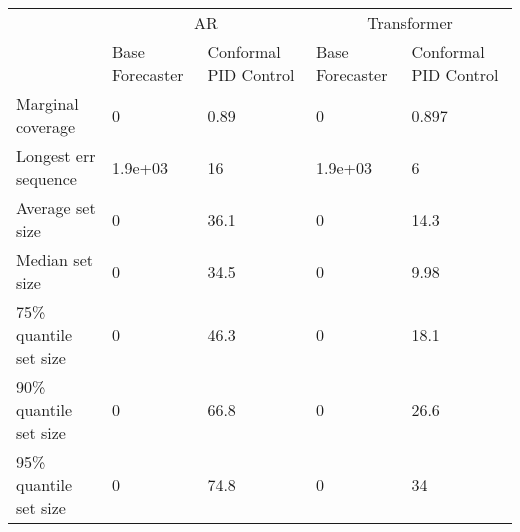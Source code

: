 \begin{tabular}{lllll}
\toprule
& \multicolumn{2}{c}{AR}& \multicolumn{2}{c}{Transformer} \\
& Base Forecaster & Conformal PID Control & Base Forecaster & Conformal PID Control \\
\midrule
Marginal coverage & 0 & 0.89 & 0 & 0.897 \\
Longest err sequence & 1.9e+03 & 16 & 1.9e+03 & 6 \\
Average set size & 0 & 36.1 & 0 & 14.3 \\
Median set size & 0 & 34.5 & 0 & 9.98 \\
75\% quantile set size & 0 & 46.3 & 0 & 18.1 \\
90\% quantile set size & 0 & 66.8 & 0 & 26.6 \\
95\% quantile set size & 0 & 74.8 & 0 & 34 \\
\bottomrule
\end{tabular}
